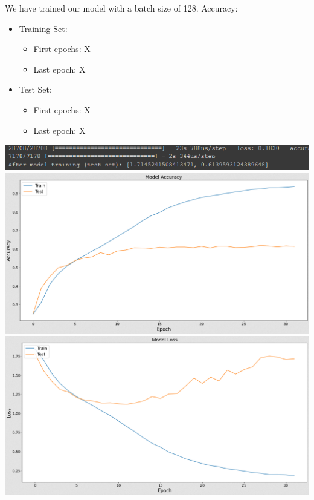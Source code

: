 We have trained our model with a batch size of 128.
Accuracy:
\begin{itemize}
      \item Training Set:
        \begin{itemize}
            \item First epochs: X
            \item Last epoch: X
        \end{itemize}
      \item Test Set:
        \begin{itemize}
            \item First epochs: X
            \item Last epoch: X
        \end{itemize}
\end{itemize}
\includegraphics[scale=0.9]{images/modelTwo/evalutaionTwo.png}
\includegraphics[scale=0.5]{images/modelTwo/accTwo.png}
\includegraphics[scale=0.5]{images/modelTwo/lossTwo.png}
